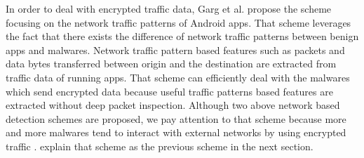 In order to deal with encrypted traffic data, Garg et al. \cite{garg2017network} propose the scheme focusing on the network traffic patterns of Android apps.
That scheme leverages the fact that there exists the difference of network traffic patterns between benign apps and malwares.
Network traffic pattern based features such as packets and data bytes transferred between origin and the destination are extracted from traffic data of running apps.
That scheme can efficiently deal with the malwares which send encrypted data because useful traffic patterns based features are extracted without deep packet inspection.  
Although two above network based detection schemes are proposed, we pay attention to that scheme \cite{garg2017network} because more and more malwares tend to interact with external networks by using encrypted traffic \cite{wang2018detecting} \cite{garg2017network}.
\We explain that scheme as the previous scheme in the next section. 
\newpage


